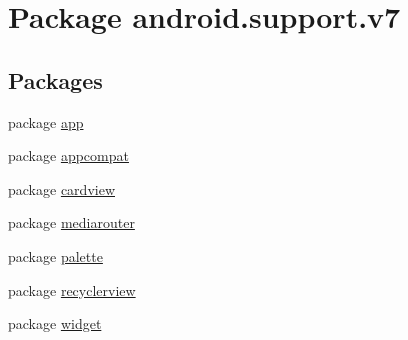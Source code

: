 \hypertarget{namespaceandroid_1_1support_1_1v7}{
\section{Package android.support.v7}
\label{namespaceandroid_1_1support_1_1v7}
}
\subsection*{Packages}
\begin{CompactItemize}
\item 
package \hyperlink{namespaceandroid_1_1support_1_1v7_1_1app}{app}
\item 
package \hyperlink{namespaceandroid_1_1support_1_1v7_1_1appcompat}{appcompat}
\item 
package \hyperlink{namespaceandroid_1_1support_1_1v7_1_1cardview}{cardview}
\item 
package \hyperlink{namespaceandroid_1_1support_1_1v7_1_1mediarouter}{mediarouter}
\item 
package \hyperlink{namespaceandroid_1_1support_1_1v7_1_1palette}{palette}
\item 
package \hyperlink{namespaceandroid_1_1support_1_1v7_1_1recyclerview}{recyclerview}
\item 
package \hyperlink{namespaceandroid_1_1support_1_1v7_1_1widget}{widget}
\end{CompactItemize}
